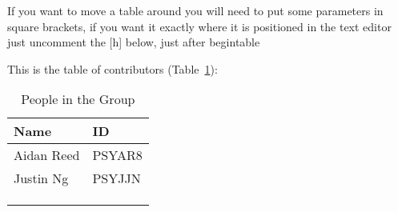 If you want to move a table around you will need to put some parameters in square brackets, if you want it exactly where it is positioned in the text editor just uncomment the [h] below, just after begin{table}

This is the table of contributors (Table~\ref{authors}):
\begin{table}%
\centering
\caption{People in the Group}
\label{authors}
\begin{tabular}{|l|l|}
\hline
\textbf{Name} & \textbf{ID} \\
\hline
Aidan Reed & PSYAR8 \\
\hline
Justin Ng & PSYJJN \\
\hline
& \\
\hline
& \\
\hline
& \\
\hline
\end{tabular}
\end{table}